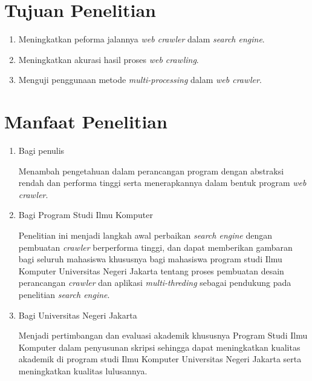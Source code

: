 \section{Tujuan Penelitian}
\begin{enumerate}
  \item Meningkatkan peforma jalannya \emph{web crawler} dalam \emph{search engine}.
  \item Meningkatkan akurasi hasil proses \emph{web crawling}.
  \item Menguji penggunaan metode \emph{multi-processing} dalam \emph{web crawler}.
\end{enumerate}

\vspace{1.0cm}

\section{Manfaat Penelitian}
\begin{enumerate}
	\item Bagi penulis

  Menambah pengetahuan dalam perancangan program dengan abstraksi rendah dan performa tinggi serta menerapkannya dalam bentuk program \emph{web crawler}.
		
	\item Bagi Program Studi Ilmu Komputer

    Penelitian ini menjadi langkah awal perbaikan \emph{search engine} dengan pembuatan \emph{crawler} berperforma tinggi, dan dapat memberikan gambaran bagi seluruh mahasiswa khususnya bagi mahasiswa program studi Ilmu Komputer Universitas Negeri Jakarta tentang proses pembuatan desain perancangan \emph{crawler} dan aplikasi \emph{multi-threding} sebagai pendukung pada penelitian \emph{search engine}.
		
	\item Bagi Universitas Negeri Jakarta 
	 	
	Menjadi pertimbangan dan evaluasi akademik khususnya Program Studi Ilmu Komputer dalam penyusunan skripsi sehingga dapat meningkatkan kualitas akademik di program studi Ilmu Komputer Universitas Negeri Jakarta serta meningkatkan kualitas lulusannya.
	 			
\end{enumerate}


\begin{comment}

\end{comment}

